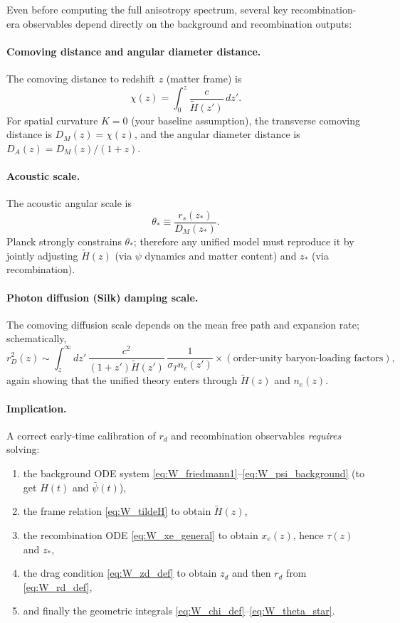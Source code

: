 \documentclass[10pt]{article}
\begin{document}
Even before computing the full anisotropy spectrum, several key recombination-era observables depend
directly on the background and recombination outputs:

\paragraph{Comoving distance and angular diameter distance.}
The comoving distance to redshift $z$ (matter frame) is
\begin{equation}
\chi(z)=\int_0^z \frac{c}{\tilde H(z')}\,dz'.
\label{eq:W_chi_def}
\end{equation}
For spatial curvature $K=0$ (your baseline assumption), the transverse comoving distance is $D_M(z)=\chi(z)$,
and the angular diameter distance is $D_A(z)=D_M(z)/(1+z)$.

\paragraph{Acoustic scale.}
The acoustic angular scale is
\begin{equation}
\theta_\ast \equiv \frac{r_s(z_\ast)}{D_M(z_\ast)}.
\label{eq:W_theta_star}
\end{equation}
Planck strongly constrains $\theta_\ast$; therefore any unified model must reproduce it by jointly
adjusting $\tilde H(z)$ (via $\psi$ dynamics and matter content) and $z_\ast$ (via recombination).

\paragraph{Photon diffusion (Silk) damping scale.}
The comoving diffusion scale depends on the mean free path and expansion rate; schematically,
\begin{equation}
r_D^2(z)\sim \int_z^\infty dz'\,
\frac{c^2}{(1+z')\tilde H(z')}\,
\frac{1}{\sigma_T n_e(z')}\times(\text{order-unity baryon-loading factors}),
\label{eq:W_damping_schematic}
\end{equation}
again showing that the unified theory enters through $\tilde H(z)$ and $n_e(z)$.

\paragraph{Implication.}
A correct early-time calibration of $r_d$ and recombination observables \emph{requires} solving:
\begin{enumerate}[leftmargin=1.2em]
\item the background ODE system \eqref{eq:W_friedmann1}--\eqref{eq:W_psi_background} (to get $H(t)$ and $\bar\psi(t)$),
\item the frame relation \eqref{eq:W_tildeH} to obtain $\tilde H(z)$,
\item the recombination ODE \eqref{eq:W_xe_general} to obtain $x_e(z)$, hence $\tau(z)$ and $z_\ast$,
\item the drag condition \eqref{eq:W_zd_def} to obtain $z_d$ and then $r_d$ from \eqref{eq:W_rd_def},
\item and finally the geometric integrals \eqref{eq:W_chi_def}--\eqref{eq:W_theta_star}.
\end{enumerate}
\end{document}
